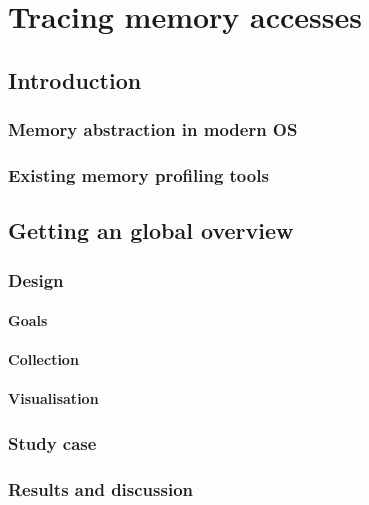 \chapter{Tracing memory accesses}

\section{Introduction}

\subsection{Memory abstraction in modern OS}


\subsection{Existing memory profiling tools}


\section{Getting an global overview}


\subsection{Design}

\subsubsection{Goals}

\subsubsection{Collection}

\subsubsection{Visualisation}

\subsection{Study case}

\subsection{Results and discussion}


